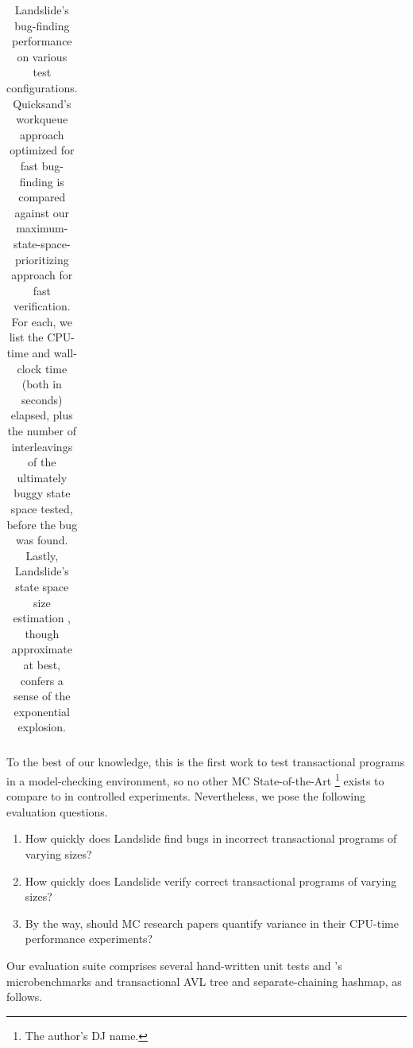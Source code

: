 \documentclass[10pt]{sigplanconf}
\begin{document}
\begin{table}[t]
\begin{center}
\begin{tabular}{cc||r|r|r||r|r|r|r}
	\end{tabular}
	\end{center}
	\caption{Landslide's bug-finding performance on various test configurations.
		Quicksand's workqueue approach optimized for fast bug-finding
		is compared against our maximum-state-space-prioritizing approach for fast verification.
		For each, we list the CPU-time and wall-clock time (both in seconds)
		elapsed, %
		plus the number of interleavings of the ultimately buggy state space tested,
		before the bug was found.
		Lastly, Landslide's state space size estimation \cite{estimation},
		though approximate at best,
		confers a sense of the exponential explosion.
	}
	\label{tab:buges}
\end{table}

To the best of our knowledge, this is the first work to test transactional programs in a model-checking environment,
so no other MC State-of-the-Art%
\footnote{The author's DJ name.}
exists to compare to in controlled experiments.
Nevertheless, we pose the following evaluation questions.

\begin{enumerate}
	\item How quickly does Landslide find bugs in incorrect transactional programs of varying sizes?
	\item How quickly does Landslide verify correct transactional programs of varying sizes?
	\item By the way, should MC research papers quantify variance in their CPU-time performance experiments?
\end{enumerate}

Our evaluation suite comprises several hand-written unit tests
and \cite{htm-mario}'s microbenchmarks and transactional AVL tree and separate-chaining hashmap,
as follows.
\end{document}
